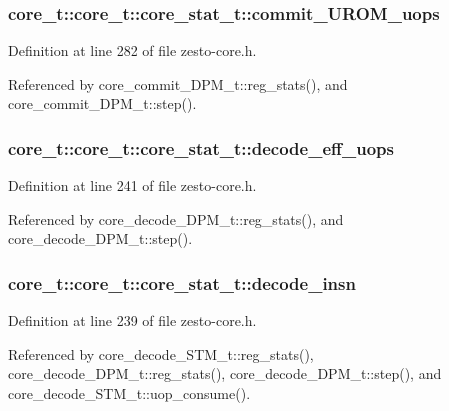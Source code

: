 \subsubsection[{commit\_\-UROM\_\-uops}]{ core\_\-t::core\_\-t::core\_\-stat\_\-t::commit\_\-UROM\_\-uops}\label{structcore__t_1_1core__stat__t_392acd37d5938f3a2b2623edc443ee19}




Definition at line 282 of file zesto-core.h.

Referenced by core\_\-commit\_\-DPM\_\-t::reg\_\-stats(), and core\_\-commit\_\-DPM\_\-t::step().
\subsubsection[{decode\_\-eff\_\-uops}]{ core\_\-t::core\_\-t::core\_\-stat\_\-t::decode\_\-eff\_\-uops}\label{structcore__t_1_1core__stat__t_d3ae76a37beaf871b235823005d246b4}




Definition at line 241 of file zesto-core.h.

Referenced by core\_\-decode\_\-DPM\_\-t::reg\_\-stats(), and core\_\-decode\_\-DPM\_\-t::step().
\subsubsection[{decode\_\-insn}]{ core\_\-t::core\_\-t::core\_\-stat\_\-t::decode\_\-insn}\label{structcore__t_1_1core__stat__t_75637749ba354148e80242ac89747641}




Definition at line 239 of file zesto-core.h.

Referenced by core\_\-decode\_\-STM\_\-t::reg\_\-stats(), core\_\-decode\_\-DPM\_\-t::reg\_\-stats(), core\_\-decode\_\-DPM\_\-t::step(), and core\_\-decode\_\-STM\_\-t::uop\_\-consume().
